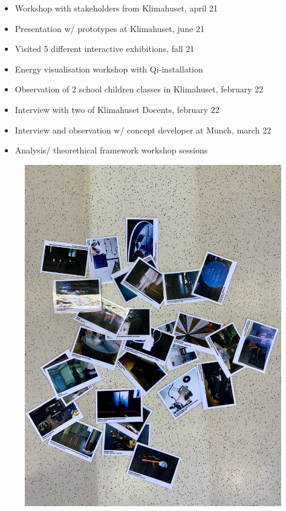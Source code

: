 \begin{itemize}
    \item Workshop with stakeholders from Klimahuset, april 21
    \item Presentation w/ prototypes at Klimahuset, june 21
    \item Visited 5 different interactive exhibitions, fall 21
    \item Energy visualisation workshop with Qi-installation
    \item Observation of 2 school children classes in Klimahuset, february 22
    \item Interview with two of Klimahuset Docents, february 22
    \item Interview and observation w/ concept developer at Munch, march 22
    \item Analysis/ theorethical framework workshop sessions
\end{itemize}

\begin{figure}[H]
\includegraphics[width=12cm]{pictures/dataset/datasett_oversikt.jpeg}
\centering 
\end{figure}

